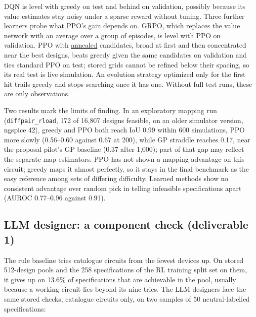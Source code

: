 \documentclass[10pt]{article}
\begin{document}
DQN is level with greedy on test and behind on validation, possibly because its value estimates stay noisy under a
sparse reward without tuning. Three further learners probe what PPO's gain depends on. GRPO, which replaces the
value network with an average over a group of episodes, is level with PPO on validation. PPO with \uline{annealed}
candidates, broad at first and then concentrated near the best designs, beats greedy given the same candidates on
validation and ties standard PPO on test; stored grids cannot be refined below their spacing, so its real test is live
simulation. An evolution strategy optimized only for the first hit trails greedy and stops searching once it has one.
Without full test runs, these are only observations.

Two results mark the limits of finding. In an exploratory mapping run (\texttt{diffpair\_rload}, 172 of 16,807
designs feasible, on an older simulator version, ngspice 42), greedy and PPO both reach IoU 0.99 within 600
simulations, PPO more slowly (0.56--0.60 against 0.67 at 200), while GP straddle reaches 0.17, near the proposal pilot's GP baseline (0.37 after
1,000); part of that gap may reflect the separate map estimators. PPO has not shown a mapping advantage on this circuit; greedy maps it almost perfectly, so it
stays in the final benchmark as the easy reference among sets of differing difficulty. Learned methods show no consistent advantage over random pick in
telling infeasible specifications apart (AUROC 0.77--0.96 against 0.91).

\subsection{LLM designer: a component check (deliverable 1)}\label{sec:llm}
The rule baseline tries catalogue circuits from the fewest devices up. On stored 512-design pools and the 258
specifications of the RL training split set on them, it gives up on 13.6\% of
specifications that are achievable in the pool, usually because a working circuit lies beyond its nine tries. The LLM designers face the same stored checks, catalogue circuits only, on two samples of 50
neutral-labelled specifications:
\end{document}
